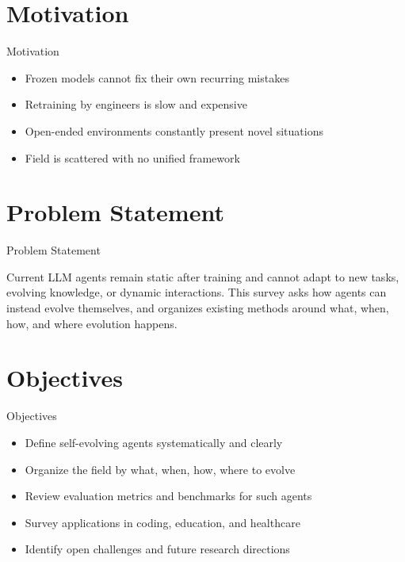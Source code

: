 \documentclass[10pt]{beamer}
\begin{document}
\section{Motivation}
\begin{frame}{Motivation}
\begin{itemize}
  \item Frozen models cannot fix their own recurring mistakes
  \item Retraining by engineers is slow and expensive
  \item Open-ended environments constantly present novel situations
  \item Field is scattered with no unified framework
\end{itemize}
\end{frame}

\section{Problem Statement}
\begin{frame}{Problem Statement}
  \begin{block}{}
  Current LLM agents remain static after training and cannot adapt to new tasks, evolving knowledge, or dynamic interactions. This survey asks how agents can instead evolve themselves, and organizes existing methods around what, when, how, and where evolution happens.
  \end{block}
\end{frame}

\section{Objectives}
\begin{frame}{Objectives}
\begin{itemize}
  \item Define self-evolving agents systematically and clearly
  \item Organize the field by what, when, how, where to evolve
  \item Review evaluation metrics and benchmarks for such agents
  \item Survey applications in coding, education, and healthcare
  \item Identify open challenges and future research directions
\end{itemize}
\end{frame}
\end{document}
